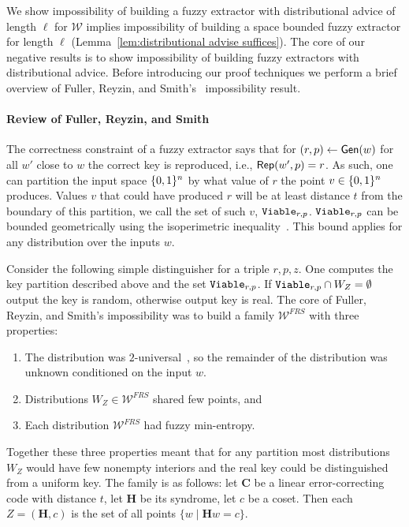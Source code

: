 We show impossibility of building a fuzzy extractor with distributional advice of length $\ell$ for $\mathcal{W}$ implies impossibility of building a space bounded fuzzy extractor for length $\ell$ (Lemma~\ref{lem:distributional advise suffices}). 
The core of our negative results is to show impossibility of building fuzzy extractors with distributional advice.   Before introducing our proof techniques we perform a brief overview of Fuller, Reyzin, and Smith's~\cite{fuller2020fuzzy} impossibility result.

\paragraph{Review of Fuller, Reyzin, and Smith~\cite{fuller2020fuzzy}}
The correctness constraint of a fuzzy extractor says that for $(r, p)\leftarrow {\ensuremath{\mathsf{Gen}}}(w)$ for all $w'$ close to $w$ the correct key is reproduced, i.e., ${\mathsf{Rep}}(w', p)=r$.  As such, one can partition the input space $\{0, 1\}^n$ by what value of $r$ the point  $v\in \{0, 1\}^n$ produces.  Values $v$ that could have produced  $r$ will be at least distance $t$ from the boundary of this partition, we call the set of such $v$, $\mathtt{Viable}_{r,p}$.  $\mathtt{Viable}_{r,p}$ can be bounded geometrically using the isoperimetric inequality~\cite{harper1966optimal}.  This bound applies for any distribution over the inputs $w$.

Consider the following simple distinguisher for a triple $r, p, z$.  One computes the key partition described above and the set $\mathtt{Viable}_{r,p}$. If $\mathtt{Viable}_{r,p} \cap W_Z =\emptyset$ output the key is random, otherwise output key is real. 
The core of Fuller, Reyzin, and Smith's impossibility was to build a family $\mathcal{W}^{FRS}$ with three properties:
\begin{enumerate}
\item The distribution was $2$-universal~\cite{carter1977universal}, so the remainder of the distribution was unknown conditioned on the input $w$. 
\item Distributions $W_Z \in \mathcal{W}^{FRS}$ shared few points, and 
\item Each distribution $\mathcal{W}^{FRS}$ had fuzzy min-entropy.
\end{enumerate}
Together these three properties meant that for any partition most distributions $W_Z$ would have few nonempty interiors and the real key could be distinguished from a uniform key.  
The family is as follows: let $\mathbf{C}$ be a linear error-correcting code with distance $t$, let $\mathbf{H}$ be its syndrome, let $c$ be a coset.  Then each $Z = (\mathbf{H}, c)$ is the set of all points $\{w \mid \mathbf{H} w = c\}$.

